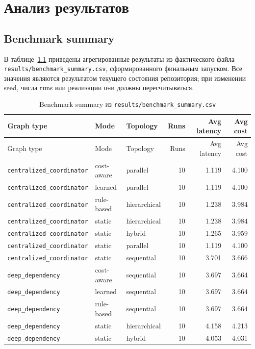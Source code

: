\documentclass[12pt,a4paper]{report}
\newcommand{\code}[1]{\texttt{#1}}
\begin{document}
\chapter{Анализ результатов}

\section{Benchmark summary}

В таблице~\ref{tab:summary} приведены агрегированные результаты из фактического файла \code{results/benchmark\_summary.csv}, сформированного финальным запуском. Все значения являются результатом текущего состояния репозитория; при изменении seed, числа runs или реализации они должны пересчитываться.

\begin{longtable}{p{}p{}p{}r r r}
\caption{Benchmark summary из \code{results/benchmark\_summary.csv}}
\label{tab:summary}\\
\toprule
Graph type & Mode & Topology & Runs & Avg latency & Avg cost \\
\midrule
\endfirsthead
\toprule
Graph type & Mode & Topology & Runs & Avg latency & Avg cost \\
\midrule
\endhead
\code{centralized\_coordinator} & cost-aware & parallel & 10 & 1.119 & 4.100 \\
\code{centralized\_coordinator} & learned & parallel & 10 & 1.119 & 4.100 \\
\code{centralized\_coordinator} & rule-based & hierarchical & 10 & 1.238 & 3.984 \\
\code{centralized\_coordinator} & static & hierarchical & 10 & 1.238 & 3.984 \\
\code{centralized\_coordinator} & static & hybrid & 10 & 1.265 & 3.959 \\
\code{centralized\_coordinator} & static & parallel & 10 & 1.119 & 4.100 \\
\code{centralized\_coordinator} & static & sequential & 10 & 3.701 & 3.666 \\
\code{deep\_dependency} & cost-aware & sequential & 10 & 3.697 & 3.664 \\
\code{deep\_dependency} & learned & sequential & 10 & 3.697 & 3.664 \\
\code{deep\_dependency} & rule-based & sequential & 10 & 3.697 & 3.664 \\
\code{deep\_dependency} & static & hierarchical & 10 & 4.158 & 4.213 \\
\code{deep\_dependency} & static & hybrid & 10 & 4.053 & 4.031 \\

\end{longtable}
\end{document}
